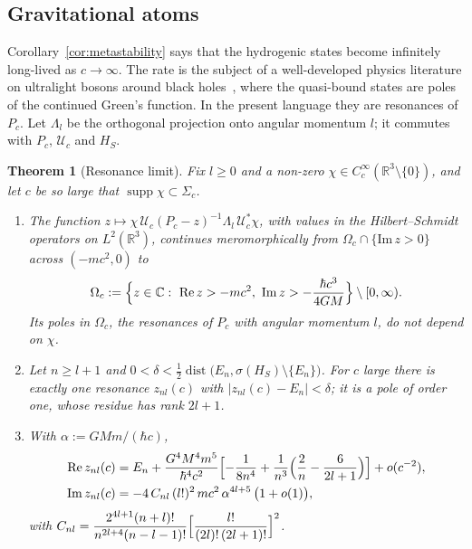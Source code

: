 \documentclass[%
 aip,
 jmp,
 amsmath,amssymb,
 reprint, onecolumn
]{revtex4-1}
\newtheorem{theorem}{Theorem}
\theoremstyle{definition}
\theoremstyle{remark}
\newcommand{\R}{\mathbb{R}}
\newcommand{\C}{\mathbb{C}}
\DeclareMathOperator{\supp}{supp}
\begin{document}
\subsection{Gravitational atoms}\label{sec:atoms}

Corollary~\ref{cor:metastability} says that the hydrogenic states
become infinitely long-lived as $c\to\infty$. The rate is the subject of
a well-developed physics literature on ultralight bosons around black
holes~\cite{Detweiler1980,Dolan2007,ArvanitakiDubovsky2011,
BaumannChiaPorto2019,BaumannChiaStoutTerHaar2019,BritoCardosoPani2020},
where the quasi-bound states are poles of the continued Green's
function. In the present language they are resonances of $P_c$. Let
$\Lambda_l$ be the orthogonal projection onto angular momentum $l$; it
commutes with $P_c$, $\mathcal{U}_c$ and $H_S$.

\begin{theorem}[Resonance limit]\label{thm:resonances}
Fix $l\geq0$ and a non-zero $\chi\in C_c^\infty(\R^3\setminus\{0\})$, and
let $c$ be so large that $\supp\chi\subset\Sigma_c$.
\begin{enumerate}[label=(\alph*)]
\item The function $z\mapsto\chi\,\mathcal{U}_c(P_c-z)^{-1}\Lambda_l\,
\mathcal{U}_c^*\chi$, with values in the Hilbert--Schmidt operators on
$L^2(\R^3)$, continues meromorphically from $\Omega_c\cap\{\mathrm{Im}\,z
>0\}$ across $(-mc^2,0)$ to
\[
\Omega_c:=\Bigl\{z\in\C:\ \mathrm{Re}\,z>-mc^2,\
\mathrm{Im}\,z>-\frac{\hbar c^3}{4GM}\Bigr\}\setminus[0,\infty).
\]
Its poles in $\Omega_c$, the resonances of $P_c$ with angular momentum
$l$, do not depend on $\chi$.
\item Let $n\geq l+1$ and $0<\delta<\frac12\operatorname{dist}\bigl(E_n,
\sigma(H_S)\setminus\{E_n\}\bigr)$. For $c$ large there is exactly one
resonance $z_{nl}(c)$ with $|z_{nl}(c)-E_n|<\delta$; it is a pole of
order one, whose residue has rank $2l+1$.
\item With $\alpha:=GMm/(\hbar c)$,
\begin{align}
\mathrm{Re}\,z_{nl}(c)&=E_n+\frac{G^4M^4m^5}{\hbar^4c^2}\Bigl[
-\frac{1}{8n^4}+\frac{1}{n^3}\Bigl(\frac2n-\frac{6}{2l+1}\Bigr)\Bigr]
+o(c^{-2}),\label{eq:res-real}\\
\mathrm{Im}\,z_{nl}(c)&=-4\,C_{nl}\,(l!)^2\,mc^2\,\alpha^{4l+5}\,
\bigl(1+o(1)\bigr),\label{eq:res-imag}
\end{align}
with $C_{nl}=\dfrac{2^{4l+1}(n+l)!}{n^{2l+4}(n-l-1)!}\Bigl[\dfrac{l!}
{(2l)!\,(2l+1)!}\Bigr]^2$.
\end{enumerate}
\end{theorem}
\end{document}
